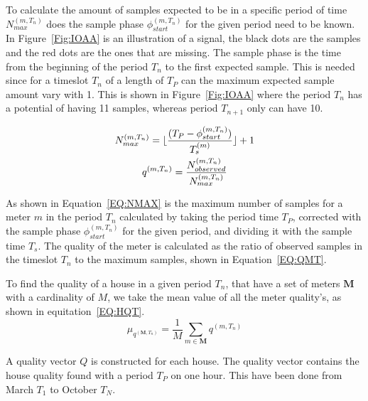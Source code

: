 To calculate the amount of samples expected to be in a specific period of time $N_{max}^{(m,T_n)}$ does the sample phase $\phi_{start}^{(m,T_n)}$ for the given period need to be known. In Figure~\ref{Fig:IOAA} is an illustration of a signal, the black dots are the samples and the red dots are the ones that are missing. The sample phase is the time from the beginning of the period $T_n$ to the first expected sample. This is needed since for a timeslot $T_n$ of a length of $T_P$ can the maximum expected sample amount vary with 1. This is shown in Figure~\ref{Fig:IOAA} where the period $T_n$ has a potential of having 11 samples, whereas period $T_{n+1}$ only can have 10.

\begin{gather}
		N_{max}^{(m,T_n)} = \lfloor \frac{(T_{P}-\phi_{start}^{(m,T_n)})}{T_s^{(m)}}\rfloor + 1 \label{EQ:NMAX} \\
		q^{(m,T_n)} = \frac{N_{observed}^{(m,T_n)}}{ N_{max}^{(m,T_n)} } \label{EQ:QMT}
\end{gather}

As shown in Equation~\ref{EQ:NMAX} is the maximum number of samples for a meter $m$ in the period $T_n$ calculated by taking the period time $T_P$, corrected with the sample phase $\phi_{start}^{(m,T_n)}$ for the given period, and dividing it with the sample time $T_s$. The  quality of the meter is calculated as the ratio of observed samples in the timeslot $T_n$ to the maximum samples, shown in Equation~\ref{EQ:QMT}. 

To find the quality of a house in a given period $T_n$, that have a set of meters $\mathbf{M}$ with a cardinality of $M$, we take the mean value of all the meter quality's, as shown in equitation~\ref{EQ:HQT}.  
\begin{equation}
	\mu_{q^{(\mathbf{M},T_n)}} = \frac{1}{M} \sum_{m \in \mathbf{M}} q^{(m,T_n)}
	\label{EQ:HQT}
\end{equation}

A quality vector $Q$ is constructed for each house. The quality vector contains the house quality found with a period $T_P$ on one hour. This have been done from March $T_1$ to October $T_N$. 

